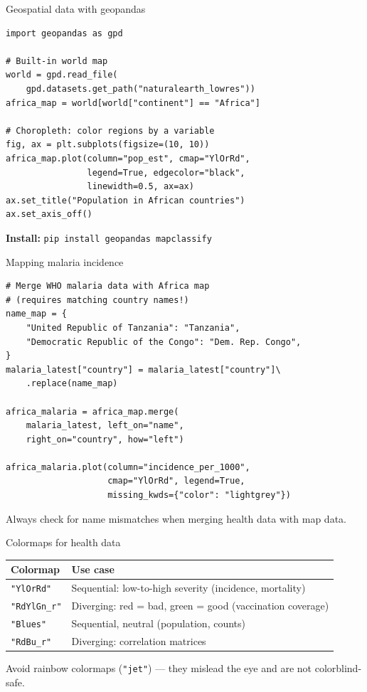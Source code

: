 \documentclass[aspectratio=169,11pt]{beamer}
\begin{document}
\begin{frame}[fragile]{Geospatial data with geopandas}
\begin{verbatim}
import geopandas as gpd

# Built-in world map
world = gpd.read_file(
    gpd.datasets.get_path("naturalearth_lowres"))
africa_map = world[world["continent"] == "Africa"]

# Choropleth: color regions by a variable
fig, ax = plt.subplots(figsize=(10, 10))
africa_map.plot(column="pop_est", cmap="YlOrRd",
                legend=True, edgecolor="black",
                linewidth=0.5, ax=ax)
ax.set_title("Population in African countries")
ax.set_axis_off()
\end{verbatim}

\textbf{Install:} \texttt{pip install geopandas mapclassify}
\end{frame}

\begin{frame}[fragile]{Mapping malaria incidence}
\begin{verbatim}
# Merge WHO malaria data with Africa map
# (requires matching country names!)
name_map = {
    "United Republic of Tanzania": "Tanzania",
    "Democratic Republic of the Congo": "Dem. Rep. Congo",
}
malaria_latest["country"] = malaria_latest["country"]\
    .replace(name_map)

africa_malaria = africa_map.merge(
    malaria_latest, left_on="name",
    right_on="country", how="left")

africa_malaria.plot(column="incidence_per_1000",
                    cmap="YlOrRd", legend=True,
                    missing_kwds={"color": "lightgrey"})
\end{verbatim}

\alert{Always check for name mismatches} when merging health data with map data.
\end{frame}

\begin{frame}{Colormaps for health data}
\begin{table}
\begin{tabular}{lp{8cm}}
\toprule
\textbf{Colormap} & \textbf{Use case} \\
\midrule
\texttt{"YlOrRd"} & Sequential: low-to-high severity (incidence, mortality) \\
\texttt{"RdYlGn\_r"} & Diverging: red = bad, green = good (vaccination coverage) \\
\texttt{"Blues"} & Sequential, neutral (population, counts) \\
\texttt{"RdBu\_r"} & Diverging: correlation matrices \\
\bottomrule
\end{tabular}
\end{table}

\vspace{6pt}
\alert{Avoid} rainbow colormaps (\texttt{"jet"}) --- they mislead the eye and are not colorblind-safe.
\end{frame}
\end{document}
